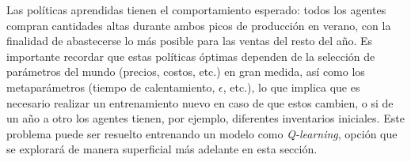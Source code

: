 Las pol\'iticas aprendidas tienen el comportamiento esperado: todos los agentes compran cantidades altas durante ambos picos de producci\'on en verano, con la finalidad de abastecerse lo m\'as posible para las ventas del resto del a\~no. Es importante recordar que estas pol\'iticas \'optimas dependen de la selecci\'on de par\'ametros del mundo (precios, costos, etc.) en gran medida, as\'i como los metapar\'ametros (tiempo de calentamiento, $\epsilon$, etc.), lo que implica que es necesario realizar un entrenamiento nuevo en caso de que estos cambien, o si de un a\~no a otro los agentes tienen, por ejemplo, diferentes inventarios iniciales. Este problema puede ser resuelto entrenando un modelo como \textit{Q-learning}, opci\'on que se explorar\'a de manera superficial m\'as adelante en esta secci\'on.\\


